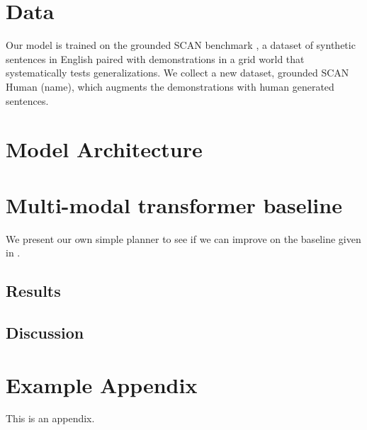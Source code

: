 \documentclass[11pt]{article}
\begin{document}
\section{Data}
Our model is trained on the grounded SCAN benchmark \citep{ruis2020benchmark}, a dataset of synthetic sentences in English paired with demonstrations in a grid world that systematically tests generalizations.
%
We collect a new dataset, grounded SCAN Human (\TODO name), which augments the demonstrations with human generated sentences.
%


\section{Model Architecture}

\section{Multi-modal transformer baseline}
We present our own simple planner to see if we can improve on the baseline given in \cite{ruis2020benchmark}.

\subsection{Results}

\subsection{Discussion}






\appendix

\section{Example Appendix}
\label{sec:appendix}

This is an appendix.
\end{document}
